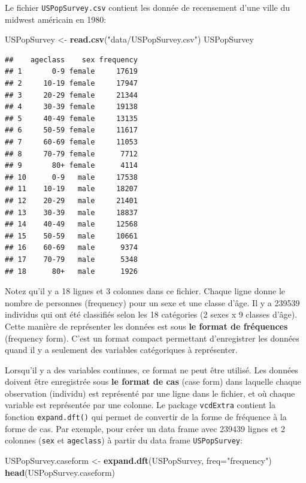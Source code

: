 \documentclass[12pt,]{book}
\newenvironment{Shaded}{\begin{snugshade}}{\end{snugshade}}
\newcommand{\DataTypeTok}[1]{\textcolor[rgb]{0.13,0.29,0.53}{#1}}
\newcommand{\KeywordTok}[1]{\textcolor[rgb]{0.13,0.29,0.53}{\textbf{#1}}}
\newcommand{\NormalTok}[1]{#1}
\newcommand{\StringTok}[1]{\textcolor[rgb]{0.31,0.60,0.02}{#1}}
\begin{document}
Le fichier \texttt{USPopSurvey.csv} contient les donnée de recensement d'une ville du midwest américain en 1980:

\begin{Shaded}
\begin{Highlighting}[]
\NormalTok{USPopSurvey <-}\StringTok{ }\KeywordTok{read.csv}\NormalTok{(}\StringTok{"data/USPopSurvey.csv"}\NormalTok{)}
\NormalTok{USPopSurvey}
\end{Highlighting}
\end{Shaded}

\begin{verbatim}
##    ageclass    sex frequency
## 1       0-9 female     17619
## 2     10-19 female     17947
## 3     20-29 female     21344
## 4     30-39 female     19138
## 5     40-49 female     13135
## 6     50-59 female     11617
## 7     60-69 female     11053
## 8     70-79 female      7712
## 9       80+ female      4114
## 10      0-9   male     17538
## 11    10-19   male     18207
## 12    20-29   male     21401
## 13    30-39   male     18837
## 14    40-49   male     12568
## 15    50-59   male     10661
## 16    60-69   male      9374
## 17    70-79   male      5348
## 18      80+   male      1926
\end{verbatim}

Notez qu'il y a 18 lignes et 3 colonnes dans ce fichier. Chaque ligne donne le nombre de personnes (frequency) pour un sexe et une classe d'âge. Il y a 239539 individus qui ont été classifiés selon les 18 catégories (2 sexes x 9 classes d'âge). Cette manière de représenter les données est sous \textbf{le format de fréquences} (frequency form). C'est un format compact permettant d'enregistrer les données quand il y a seulement des variables catégoriques à représenter.

Lorsqu'il y a des variables continues, ce format ne peut être utilisé. Les données doivent être enregistrée sous \textbf{le format de cas} (case form) dans laquelle chaque observation (individu) est représenté par une ligne dans le fichier, et où chaque variable est représentée par une colonne. Le package \texttt{vcdExtra} contient la fonction \texttt{expand.dft()} qui permet de convertir de la forme de fréquence à la forme de cas. Par exemple, pour créer un data frame avec 239439 lignes et 2 colonnes (\texttt{sex} et \texttt{ageclass}) à partir du data frame \texttt{USPopSurvey}:

\begin{Shaded}
\begin{Highlighting}[]
\NormalTok{USPopSurvey.caseform <-}\StringTok{ }\KeywordTok{expand.dft}\NormalTok{(USPopSurvey, }\DataTypeTok{freq=}\StringTok{"frequency"}\NormalTok{)}
\KeywordTok{head}\NormalTok{(USPopSurvey.caseform)}
\end{Highlighting}
\end{Shaded}
\end{document}
